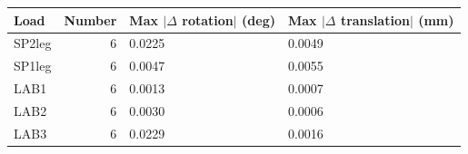 \begin{tabular}{lrll}
\toprule
Load & Number & Max $|\Delta$ rotation$|$ (deg) & Max $|\Delta$ translation$|$ (mm) \\
\midrule
SP2leg & 6 & 0.0225 & 0.0049 \\
SP1leg & 6 & 0.0047 & 0.0055 \\
LAB1 & 6 & 0.0013 & 0.0007 \\
LAB2 & 6 & 0.0030 & 0.0006 \\
LAB3 & 6 & 0.0229 & 0.0016 \\
\bottomrule
\end{tabular}
